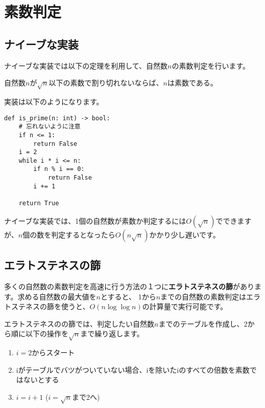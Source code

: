 \documentclass{jlreq}
\begin{document}
\section{素数判定}

\subsection{ナイーブな実装}

ナイーブな実装では以下の定理を利用して、自然数$n$の素数判定を行います。

\begin{tcolorbox}[enhanced,title=定理1, 
  attach boxed title to top left, 
  colback=white!95!blue,
  colbacktitle=white!10!blue!50!black,
  drop fuzzy shadow,
  boxrule=0.25mm,
  ]
  自然数$n$が$\sqrt{n}$以下の素数で割り切れないならば、$n$は素数である。
\end{tcolorbox}
実装は以下のようになります。

\begin{lstlisting}[caption=ナイーブな素数判定, frame=TRBL, label={naivePriem}]
def is_prime(n: int) -> bool:
    # 忘れないように注意
    if n <= 1:
        return False
    i = 2
    while i * i <= n:
        if n % i == 0:
            return False
        i += 1
    
    return True

\end{lstlisting}

ナイーブな実装では、1個の自然数が素数か判定するには$O(\sqrt{n})$でできますが、$n$個の数を判定するとなったら$O(n \sqrt{n})$かかり少し遅いです。

\subsection{エラトステネスの篩}
多くの自然数の素数判定を高速に行う方法の１つに\textbf{エラトステネスの篩}があります。求める自然数の最大値を$n$とすると、
1から$n$までの自然数の素数判定はエラトステネスの篩を使うと、$O(n \log \log n)$の計算量で実行可能です。

エラトステネスのの篩では、判定したい自然数$n$までのテーブルを作成し、2から順に以下の操作を$\sqrt{n}$まで繰り返します。

\begin{enumerate}
  \item $i = 2$からスタート
  \item iがテーブルでバツがついていない場合、iを除いたiのすべての倍数を素数ではないとする
  \item $i = i + 1$ ($i = \sqrt{n}$まで2へ)
\end{enumerate}
\end{document}
